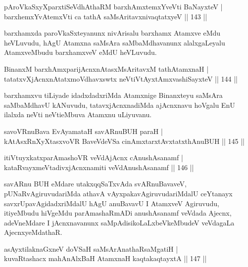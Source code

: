 \begin{shl}
pAroVkaSxyXparxtiSeVdhAthaRM barxhAmx\s \s temxYveVti BaNayxteV |\\
barxhemxYvA\s \s temxVti ca tathA saMsAritavxnivaqtatxyeV \hfill || 143 ||
\end{shl}

\begin{artha}
barxhamxda paroVkaSxteyanunx nivArisalu barxhamx Atamxve eMdu heVLuvudu, hAgU Atamxna saMsAra saMbaMdhavanunx alalxgaLeyalu AtamxveMbudu barxhamxveV eMdU heVLuvudu.
\end{artha}


\begin{shl}
BinanxM barxhAmxparijAcnxnAtasxMsAritavxM tathA\s \s tamxnaH |\\
tatatxvXjAcnxnAtatxmoVdhavxswtx neVtiVtAyxtAmx\s vashiSayxteV \hfill  || 144 ||
\end{shl}

\begin{artha}
barxhamxvu tiLiyade idadxdadxriMda Atamxnige Binanxteyu saMsAra
saMbaMdhavU kANuvudu, tatavxjAcnxnadiMda ajAcnxnavu hoVgalu EnU
ilalxda neVti neVtieMbuva Atamxnu uLiyuvanu.
\end{artha}


\begin{shl}
savoVR\s nuBava EvAyamataH savARnuBUH paraH |\\
kAtAsxRnXyXtasxvoVR BaveVdeVSa cinAmxtarxtAvxtatxthA\s nuBUH \hfill || 145 ||
\end{shl}
\begin{shl}
itiVtuyxkatxparAmashoVR veVdAjAcnx cAnushAsanamf |\\
kataRvayxmeVtadivxjAcnxnamiti veVdAnushAsanamf \hfill || 146 ||
\end{shl}

\begin{artha}
savARnu BUH eMdare utakxqqSaTxvAda svARnuBavaveV, pUNaRvAgiruvudariMda
athavA vAyxpakavAgiruvudariMdalU ceYtanayx savxrUpavAgidadxriMdalU
hAgU anuBavavU I AtamxveV Agiruvudu, itiyeMbudu hiVgeMdu
parAmashaRmADi anushAsanamf veVdada Ajecnx, adeVneMdare I
jAcnxnavanunx saMpAdisikoLaLxbeVkeMbudeV veVdagaLa AjecnxyeMdathaR.
\end{artha}

\begin{shl}
asAyxtilaknaGxneV doVSaH saMsArAnathaRsaMgatiH |\\
kuvaRtashacx mahAnAlxBaH AtamxnaH kaqtakaqtayxtA \hfill || 147 ||
\end{shl}

